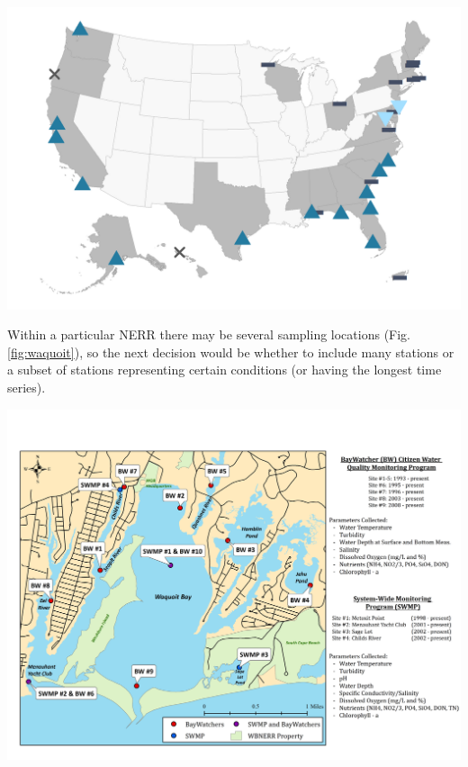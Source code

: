 \documentclass[
  10pt,
]{article}
\let\origfigure\figure
\let\endorigfigure\endfigure
\renewenvironment{figure}[1][2] {
    \expandafter\origfigure\expandafter[H]
} {
    \endorigfigure
}
\begin{document}
\begin{figure}

{\centering \includegraphics[width=25in]{images/nerrs_map} 

}

\caption{National Estuarine Research Reserve locations in the US, with trend indicators for an example metric: Triangle pointing up = increasing trend; Triangle pointing down = decreasing trend, Flat line = no trend.}\label{fig:nerrUS}
\end{figure}

Within a particular NERR there may be several sampling locations (Fig.
\ref{fig:waquoit}), so the next decision would be whether to include
many stations or a subset of stations representing certain conditions
(or having the longest time series).

\begin{figure}

{\centering \includegraphics[width=0.95\linewidth]{images/Waquoit_Map} 

}

\caption{Waquit Bay National Estuarine Research Reserve map with sampling locations.}\label{fig:waquoit}
\end{figure}
\end{document}

